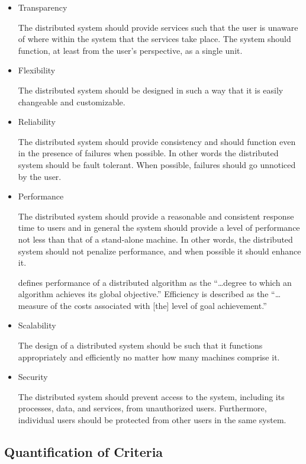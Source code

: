 \documentclass{report}
\begin{document}
\begin{itemize}
	
  \item Transparency

	The distributed system should provide services such that the user is
	unaware of where within the system that the services take place.
	The system should function, at least from the user's perspective, as
	a single unit. 


  \item Flexibility

	The distributed system should be designed in such a way that it is
	easily changeable and customizable.

  \item Reliability

	The distributed system should provide consistency and should
	function even in the presence of failures when possible.  In other
	words the distributed system should be fault tolerant.  When
	possible, failures should go unnoticed by the user.

  \item Performance

	The distributed system should provide a reasonable and consistent
	response time to users and in general the system should provide a
	level of performance not less than that of a stand-alone machine.
	In other words, the distributed system should not penalize
	performance, and when possible it should enhance it.

	\cite{Casavant} defines performance of a distributed algorithm as
the ``\dots degree to which an algorithm achieves its global objective.''
Efficiency is described as the ``\dots measure of the costs associated with
[the] level of goal achievement.''

  \item Scalability

	The design of a distributed system should be such that it functions
	appropriately and efficiently no matter how many machines comprise
	it.  

  \item Security

	The distributed system should prevent access to the system,
	including its processes, data, and services, from unauthorized
	users.  Furthermore, individual users should be protected from other
	users in the same system.

\end{itemize}


\subsection{Quantification of Criteria}
\end{document}

